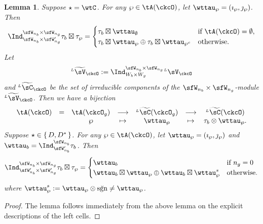 \documentclass[12pt,a4paper]{amsart}
\newcommand{\sgn}{\operatorname{sgn}}
\numberwithin{equation}{section}
\newtheorem{lem}[thm]{Lemma}
\theoremstyle{remark}
\def\LV{{}^{\scriptscriptstyle L}\sV}
\def\tLV{{}^{\scriptscriptstyle L}\widetilde{\sV}}
\def\tLC{{}^{\scriptscriptstyle L}\widetilde{\sC}}
\def\sP{\wp}
\def\brsgn{\breve{\sgn}}
\begin{document}
\begin{lem}\label{lem:WLcell}
  Suppose $\star=\wtC$. For any $\wp\in \tA(\ckcO)$, let
  $\wttau_{\wp} = (\imath_{\wp},\jmath_{\wp})$. Then
  \[
    \Ind_{\sfW_{n_{b}}\times \sfW'_{n_{g}}}^{\sfW_{n_{b}}\times \sfW_{n_{g}}} \tau_{b}\boxtimes \tau_{\wp} =
    \begin{cases}
      \tau_{b}\boxtimes \wttau_{\emptyset} & \text{if } \tA(\ckcO) =\emptyset,\\
      \tau_{b}\boxtimes \wttau_{\wp} \oplus \tau_{b}\boxtimes \wttau_{\wp^{c}}
      &\text{otherwise}.
    \end{cases}
  \]
Let
\[
  \tLV_{\ckcO}:= \Ind_{W_{b}\times W_{g}}^{\sfW_{n_{b}}\times \sfW_{n_{g}}}\LV_{\ckcO}
\]
and $\tLC_{\ckcO}$ be the set of irreducible components of the
$\sfW_{n_{b}}\times \sfW_{n_{g}}$-module $\tLV_{\ckcO}$. Then we have a
bijection
  \[
      \begin{array}{lccccccc}
        \tA(\ckcO)&=&\tA(\ckcO_{g}) & \longrightarrow & \tLC(\ckcO_{g})
        & \longrightarrow & \tLC(\ckcO)\\
                  &  &\wp & \mapsto & \wttau_{\wp}
        & \mapsto & \tau_{b}\otimes \wttau_{\wp}.
      \end{array}
  \]
  Suppose $\star\in\set{D,D^{*}}$. For any $\wp\in \tA(\ckcO)$, let
  $\wttau_{\wp} = (\imath_{\wp},\jmath_{\wp})$ and $\wttau_{b} = \Ind_{\sfW'_{n_{b}}}^{\sfW_{n_{b}}}\tau_{b}$.
  Then
  \[
    \Ind_{\sfW'_{n_{b}}\times \sfW'_{n_{g}}}^{\sfW_{n_{b}}\times \sfW_{n_{g}}} \tau_{b}\boxtimes \tau_{\wp} =
    \begin{cases}
      \wttau_{b} & \text{if } n_{g}=0\\
      \wttau_{b}\boxtimes \wttau_{\wp} \oplus \wttau_{b}\boxtimes \wttau_{\wp}^{s}
      &\text{otherwise}.
    \end{cases}
  \]
  where $\wttau_{\wp}^{s}:= \wttau_{\wp}\otimes \brsgn \neq \wttau_{\sP}$.

\end{lem}
\begin{proof}
  The lemma follows immediately from the above lemma on the explicit
  descriptions of the left cells.
\end{proof}
\end{document}
